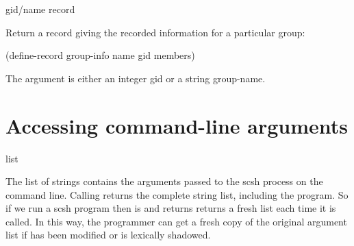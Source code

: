   {gid/name}  {record}
\begin{desc}
    Return a  record giving the recorded information for a
particular group:
\begin{code}
(define-record group-info
  name gid members)\end{code}
The  argument is either an integer gid or a string group-name.
\end{desc}

\section{Accessing command-line arguments}

 {{\str} list}
\begin{desc}
The list of strings  contains the arguments
passed to the scsh process on the command line.
Calling  returns the complete 
string list, including the program. So if we run a scsh program
then  is
and  returns
 returns a fresh list each time it is called.
In this way, the programmer can get a fresh copy of the original
argument list if  has been modified or is lexically
shadowed.
\end{desc}

